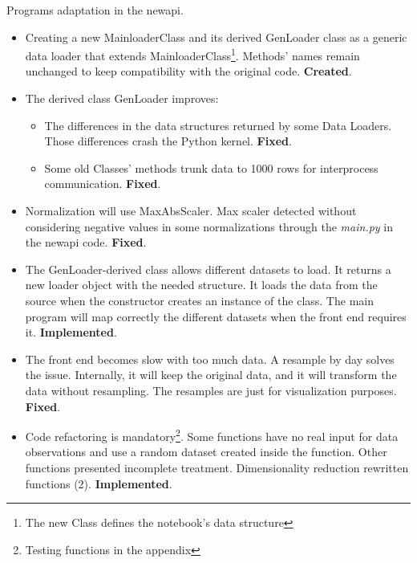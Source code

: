 \documentclass[a4paper]{article}
\begin{document}
Programs adaptation in the new\textunderscore api.

\begin{itemize}
\item Creating a new MainloaderClass and its derived GenLoader class as a generic data loader that extends MainloaderClass\footnote{The new Class defines the notebook's data structure}. Methods' names remain unchanged to keep compatibility with the original code. \textbf{Created}.
\end{itemize}

\sffamily \footnotesize
\begin{center}

\end{center}
\rmfamily \normalsize

\begin{itemize}
\item The derived class GenLoader improves:

\begin{itemize}
\item The differences in the data structures returned by some Data Loaders. Those differences crash the Python kernel. \textbf{Fixed}.

\item Some old Classes' methods trunk data to 1000 rows for interprocess communication. \textbf{Fixed}.
\end{itemize}

\item Normalization will use MaxAbsScaler. Max scaler detected without considering negative values in some normalizations through the \emph{main.py} in the new\textunderscore api code. \textbf{Fixed}.

\item The GenLoader-derived class allows different datasets to load. It returns a new loader object with the needed structure. It loads the data from the source when the constructor creates an instance of the class. The main program will map correctly the different datasets when the front end requires it. \textbf{Implemented}.

\item The front end becomes slow with too much data. A resample by day solves the issue. Internally, it will keep the original data, and it will transform the data without resampling. The resamples are just for visualization purposes. \textbf{Fixed}.

\item Code refactoring is mandatory\footnote{Testing functions in the appendix}. Some functions have no real input for data observations and use a random dataset created inside the function. Other functions presented incomplete treatment. Dimensionality reduction rewritten functions (2). \textbf{Implemented}.


\end{itemize}
\end{document}
